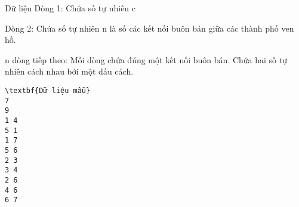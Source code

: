 Dữ liệu  
Dòng 1: Chứa số tự nhiên c  

   Dòng  2:   Chứa số tự nhiên n là số các kết nối buôn bán giữa các thành phố ven hồ.  

   n dòng tiếp theo:   Mỗi dòng chứa đúng một kết nối buôn bán. Chứa hai số tự nhiên cách nhau bởi một dấu cách.  
\begin{verbatim}
\textbf{Dữ liệu mẫu}
7
9
1 4
5 1
1 7
5 6
2 3
3 4
2 6
4 6
6 7
\end{verbatim}
